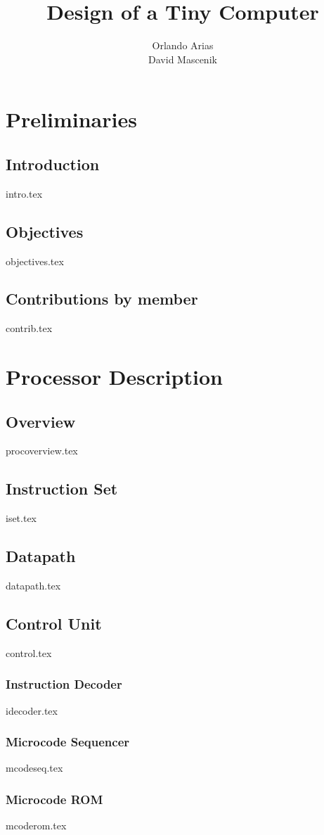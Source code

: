 \documentclass[letterpaper,11pt]{report}
\title{Design of a Tiny Computer}
\author{Orlando Arias\\David Mascenik}
\begin{document}
	\maketitle
	\tableofcontents
	\chapter{Preliminaries}
	\section{Introduction}
	{intro.tex}
	\section{Objectives}
	{objectives.tex}
	\section{Contributions by member}
	{contrib.tex}
	\chapter{Processor Description}
	\section{Overview}
	{procoverview.tex}
	\section{Instruction Set}
	{iset.tex}
	\section{Datapath}
	{datapath.tex}
	\section{Control Unit}
	{control.tex}
	\subsection{Instruction Decoder}
	{idecoder.tex}
	\subsection{Microcode Sequencer}
	{mcodeseq.tex}
	\subsection{Microcode ROM}
	{mcoderom.tex}
\end{document}
